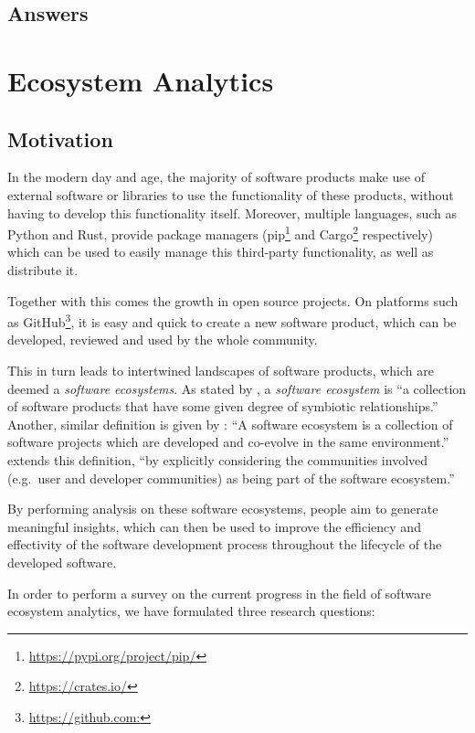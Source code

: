 \documentclass[]{book}
\let\rmarkdownfootnote\footnote%
\def\footnote{\protect\rmarkdownfootnote}
\begin{document}
\section{Answers}\label{answers-1}

\chapter{Ecosystem Analytics}\label{ecosystem-analytics}

\section{Motivation}\label{motivation-3}

In the modern day and age, the majority of software products make use of
external software or libraries to use the functionality of these
products, without having to develop this functionality itself. Moreover,
multiple languages, such as Python and Rust, provide package managers
(pip\footnote{\url{https://pypi.org/project/pip/}} and Cargo\footnote{\url{https://crates.io/}}
respectively) which can be used to easily manage this third-party
functionality, as well as distribute it.

Together with this comes the growth in open source projects. On
platforms such as GitHub\footnote{\url{https://github.com:}}, it is easy
and quick to create a new software product, which can be developed,
reviewed and used by the whole community.

This in turn leads to intertwined landscapes of software products, which
are deemed a \emph{software ecosystems}. As stated by
\citet{Messerschmitt2003}, a \emph{software ecosystem} is ``a collection
of software products that have some given degree of symbiotic
relationships.'' Another, similar definition is given by
\citet{Lungu2009}: ``A software ecosystem is a collection of software
projects which are developed and co-evolve in the same environment.''
\citet{Mens2013} extends this definition, ``by explicitly considering
the communities involved (e.g.~user and developer communities) as being
part of the software ecosystem.''

By performing analysis on these software ecosystems, people aim to
generate meaningful insights, which can then be used to improve the
efficiency and effectivity of the software development process
throughout the lifecycle of the developed software.

In order to perform a survey on the current progress in the field of
software ecosystem analytics, we have formulated three research
questions:
\end{document}
